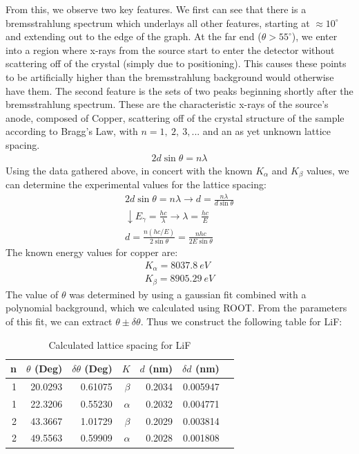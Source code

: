 \documentclass[%
 reprint,
 amsmath,amssymb,
 aps,
 pra,
]{revtex4-1}
\begin{document}
From this, we observe two key features. We first can see that there is a bremsstrahlung spectrum which underlays all other features, starting at $\approx10^\circ$ and extending out to the edge of the graph. At the far end ($\theta > 55^\circ$), we enter into a region where x-rays from the source start to enter the detector without scattering off of the crystal (simply due to positioning). This causes these points to be artificially higher than the bremsstrahlung background would otherwise have them. The second feature is the sets of two peaks beginning shortly after the bremsstrahlung spectrum. These are the characteristic x-rays of the source's anode, composed of Copper, scattering off of the crystal structure of the sample according to Bragg's Law, with $n = 1,~2,~3,...$ and an as yet unknown lattice spacing. 
\begin{gather}
	2d\sin{\theta} = n \lambda
\end{gather}
Using the data gathered above, in concert with the known $K_\alpha$ and $K_\beta$ values, we can determine the experimental values for the lattice spacing:
\begin{gather}
	2d\sin{\theta} = n\lambda \rightarrow d = \frac{n\lambda}{d\sin{\theta}} \nonumber \\
	\downarrow E_\gamma = \frac{hc}{\lambda} \rightarrow \lambda = \frac{hc}{E} \nonumber \\
	d = \frac{n (hc/E)}{2 \sin{\theta}} = \frac{nhc}{2E\sin{\theta}}
\end{gather}
The known energy values for copper are:
\begin{gather}
	K_\alpha = 8037.8 ~eV \nonumber \\
	K_\beta = 8905.29 ~eV \nonumber
\end{gather}
The value of $\theta$ was determined by using a gaussian fit combined with a polynomial background, which we calculated using ROOT. From the parameters of this fit, we can extract $\theta \pm \delta \theta$. Thus we construct the following table for LiF:
\begin{table}[htbp]
	\begin{center}
	\begin{tabular}{|r|r|r|r|r|r|l|}
		\hline
		n & $\theta$ (Deg) & $\delta \theta$ (Deg) & $K$ &  $d$ (nm) & \multicolumn{1}{r|}{$\delta d$ (nm)} \\ \hline
		1 & 20.0293 & 0.61075 & $\beta$ &  0.2034 & 0.005947 \\ \hline
		1 & 22.3206 & 0.55230 & $\alpha$ &  0.2032 & 0.004771 \\ \hline
		2 & 43.3667 & 1.01729 & $\beta$ &  0.2029 & 0.003814 \\ \hline
		2 & 49.5563 & 0.59909 & $\alpha$ &  0.2028 & 0.001808 \\ \hline
	\end{tabular}
	\end{center}
	\caption{Calculated lattice spacing for LiF}
	\label{table:LiF}
\end{table}
\end{document}
